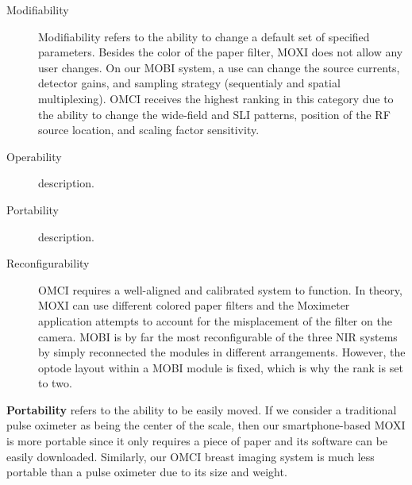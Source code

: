 \begin{description}
   \item[Modifiability] Modifiability refers to the ability to change a default set of specified parameters. Besides the color of the paper filter, \ac{MOXI} does not allow any user changes. On our \ac{MOBI} system, a use can change the source currents, detector gains, and sampling strategy (sequentialy and spatial multiplexing). \ac{OMCI} receives the highest ranking in this category due to the ability to change the wide-field and \ac{SLI} patterns, position of the \ac{RF} source location, and scaling factor sensitivity. 
   \item[Operability] description.
   \item[Portability] description.
   \item[Reconfigurability] \ac{OMCI} requires a well-aligned and calibrated system to function. In theory, \ac{MOXI} can use different colored paper filters and the Moximeter application attempts to account for the misplacement of the filter on the camera. \ac{MOBI} is by far the most reconfigurable of the three \ac{NIR} systems by simply reconnected the modules in different arrangements. However, the optode layout within a \ac{MOBI} module is fixed, which is why the rank is set to two. 
\end{description}


\textbf{Portability} refers to the ability to be easily moved. If we consider a traditional pulse oximeter as being the center of the scale, then our smartphone-based \ac{MOXI} is more portable since it only requires a piece of paper and its software can be easily downloaded. Similarly, our \ac{OMCI} breast imaging system is much less portable than a pulse oximeter due to its size and weight. 


